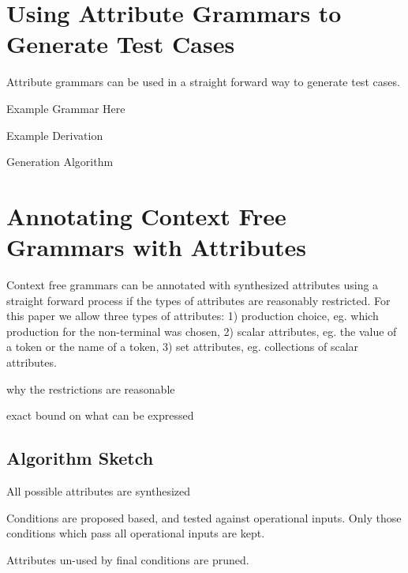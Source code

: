 
\section{Using Attribute Grammars to Generate Test Cases}
\label{attrgram}

Attribute grammars can be used in a straight forward way to generate test cases. 

Example Grammar Here

Example Derivation

Generation Algorithm

\section{Annotating Context Free Grammars with Attributes}

Context free grammars can be annotated with synthesized attributes using a
straight forward process if the types of attributes are reasonably restricted.
For this paper we allow three types of attributes: 1) production choice, eg.
which production for the non-terminal was chosen, 2) scalar attributes, eg. the
value of a token or the name of a token, 3) set attributes, eg. collections of
scalar attributes. 

why the restrictions are reasonable 

exact bound on what can be expressed

\subsection{Algorithm Sketch}

All possible attributes are synthesized

Conditions are proposed based, and tested against operational inputs. Only those
conditions which pass all operational inputs are kept.

Attributes un-used by final conditions are pruned.

